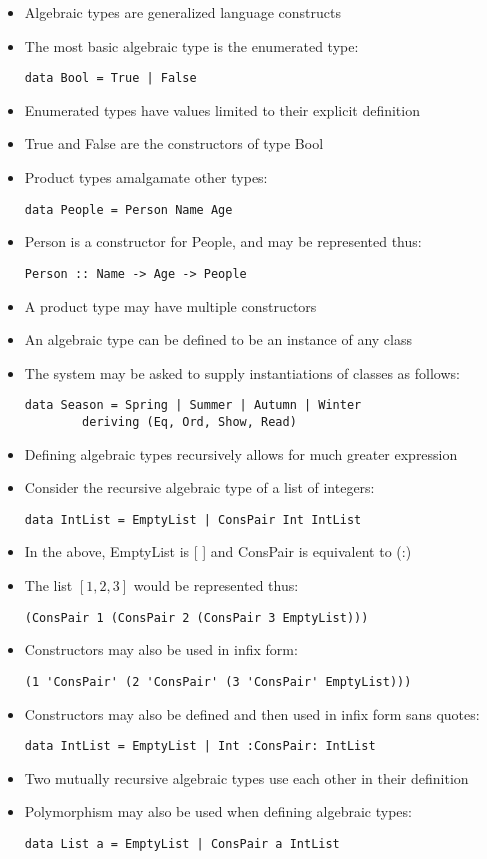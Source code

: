 \documentclass{article}
\begin{document}
\begin{itemize}
\item Algebraic types are generalized language constructs
\item The most basic algebraic type is the enumerated type:
\begin{lstlisting}
data Bool = True | False
\end{lstlisting}
\item Enumerated types have values limited to their explicit definition
\item True and False are the constructors of type Bool
\item Product types amalgamate other types:
\begin{lstlisting}
data People = Person Name Age
\end{lstlisting}
\item Person is a constructor for People, and may be represented thus:
\begin{lstlisting}
Person :: Name -> Age -> People
\end{lstlisting}
\item A product type may have multiple constructors
\item An algebraic type can be defined to be an instance of any class
\item The system may be asked to supply instantiations of classes as follows:
\begin{lstlisting}
data Season = Spring | Summer | Autumn | Winter
		deriving (Eq, Ord, Show, Read)
\end{lstlisting}
\item Defining algebraic types recursively allows for much greater expression
\item Consider the recursive algebraic type of a list of integers:
\begin{lstlisting}
data IntList = EmptyList | ConsPair Int IntList
\end{lstlisting}
\item In the above, EmptyList is [ ] and ConsPair is equivalent to (:)
\item The list $[1,2,3]$ would be represented thus:
\begin{lstlisting}
(ConsPair 1 (ConsPair 2 (ConsPair 3 EmptyList)))
\end{lstlisting}
\item Constructors may also be used in infix form:
\begin{lstlisting}
(1 'ConsPair' (2 'ConsPair' (3 'ConsPair' EmptyList)))
\end{lstlisting}
\item Constructors may also be defined and then used in infix form sans quotes:
\begin{lstlisting}
data IntList = EmptyList | Int :ConsPair: IntList
\end{lstlisting}
\item Two mutually recursive algebraic types use each other in their definition
\item Polymorphism may also be used when defining algebraic types:
\begin{lstlisting}
data List a = EmptyList | ConsPair a IntList
\end{lstlisting}
\end{itemize}
\end{document}
